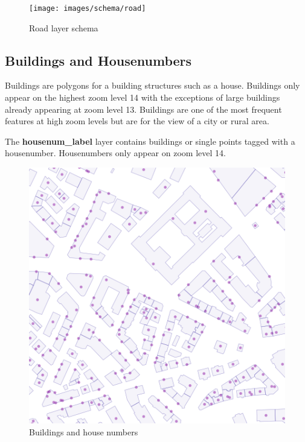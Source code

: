 \begin{figure}[H]
  \centering
  \texttt{[image: images/schema/road]}
  \caption{Road layer schema}
\end{figure}



\subsection{Buildings and Housenumbers}

\noindent\begin{minipage}[t]{0.48\linewidth}
    \vspace{0pt}
    Buildings are polygons for a building structures such as a house. Buildings only appear on the highest zoom level 14 with the exceptions of large buildings already appearing at zoom level 13. Buildings are one of the most frequent features at high zoom levels but are for the view of a city or rural area.
    
    The \textbf{housenum\_label}  layer contains buildings or single points tagged with a housenumber. Housenumbers only appear on zoom level 14.

\end{minipage}
\hfill
\begin{minipage}[t]{0.48\linewidth}
    \vspace{-20pt}
    \begin{figure}[H]
      \includegraphics[width=1\textwidth]{images/schema/building_example}
      \caption{Buildings and house numbers}
    \end{figure}
\end{minipage}

